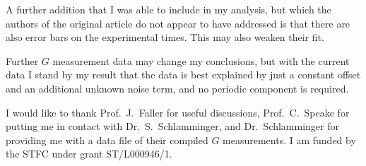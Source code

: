 \documentclass[doublecol]{epl2}
\begin{document}
A further addition that I was able to include in my analysis, but which the authors of the original 
article do not appear to have addressed is that there are also error bars on the
experimental times. This may also weaken their fit.

Further $G$ measurement data may change my conclusions, but with the current data I stand by my 
result that the data is best explained by just a constant offset and an additional unknown 
noise term, and no periodic component is required.

\acknowledgements

I would like to thank Prof.\ J.\ Faller for useful discussions, Prof.\ C.\ Speake for putting me in contact with
Dr.\ S.\ Schlamminger, and Dr.\ Schlamminger for providing me with a data file of their compiled $G$ measurements.
I am funded by the STFC under grant ST/L000946/1.



\end{document}
